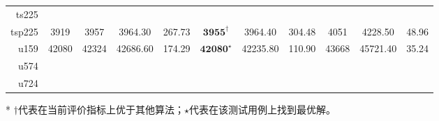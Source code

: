 \documentclass[12pt]{ctexart}
\begin{document}
\begin{table}[htbp]
\begin{tabular}{rcccccccccc}
        ts225                                                                                                                                                                                                                                                                                     \\
        tsp225                        & 3919                              & 3957                        & 3964.30                                & 267.73           & $\textbf{3955}^\dag$    & 3964.40          & 304.48           & 4051                  & 4228.50          & 48.96            \\
        u159                          & 42080                             & 42324                       & 42686.60                               & 174.29           & $\textbf{42080}^\star$  & 42235.80         & 110.90           & 43668                 & 45721.40         & 35.24            \\
        u574                                                                                                                                                                                                                                                                                      \\
        u724                                                                                                                                                                                                                                                                                      \\
        \bottomrule
    \end{tabular}

    \begin{tablenotes}
        \item [*]   $\dag$代表在当前评价指标上优于其他算法；$\star$代表在该测试用例上找到最优解。
    \end{tablenotes}
\end{table}
\end{document}
